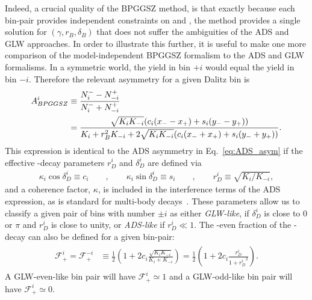 Indeed, a crucial quality of the BPGGSZ method, is that exactly because each bin-pair provides independent constraints on \xpm and \ypm, the method provides a single solution for $(\gamma, r_B, \delta_B)$ that does not suffer the ambiguities of the ADS and GLW approaches. In order to illustrate this further, it is useful to make one more comparison of the model-independent BPGGSZ formalism to the ADS and GLW formalisms. In a \CP symmetric world, the \Bp yield in bin $+i$ would equal the \Bm yield in bin $-i$. Therefore the relevant \CP asymmetry for a given Dalitz bin is
\begin{align}
\begin{split}\label{eq:Ai_definition}
        A_{BPGGSZ}^i &\equiv \frac{N^-_i - N^+_{-i}}{N^-_i + N^+_{-i}} \\
    &= \frac{\sqrt{K_i K_{-i}}(c_i(x_--x_+)+s_i(y_--y_+))}{K_i+r_B^2K_{-i} + 2 \sqrt{K_i K_{-i}}(c_i(x_-+x_+)+s_i(y_-+y_+))}.
\end{split}
\end{align}
This expression is identical to the ADS asymmetry in Eq.~\eqref{eq:ADS_asym} if the effective \D-decay parameters $r_D^i$ and $\delta_D^i$ are defined via
\begin{align}
    \kappa_i\cos\delta_D^i \equiv c_i \qquad, \qquad \kappa_i\sin \delta_D^i \equiv s_i \qquad, \qquad r_D^i \equiv \sqrt{K_i/K_{-i}},
\end{align}
and a coherence factor, $\kappa$, is included in the interference terms of the ADS expression, as is standard for multi-body \D decays~\cite{gronauImprovingBoundsGamma2003}. These parameters allow us to classify a given pair of bins with number $\pm i$ as either \emph{GLW-like}, if $ \delta_D^i$ is close to $0$ or $\pi$ and $r_D^i$  is close to unity, or \emph{ADS-like} if $r_D^i \ll 1$. The \CP-even fraction of the \D-decay can also be defined for a given bin-pair:
\begin{align}
\begin{split}
    \mathcal F_{+}^i = \mathcal F_+^{-i} &\equiv \frac{1}{2}\left(1 + 2c_i \frac{\sqrt{K_i K_{-i}}}{K_i + K_{-i}}\right) = \frac{1}{2}\left(1 + 2c_i \frac{r_D^i}{1+{r_D^i}^2}\right).
\end{split}
\end{align}
A GLW-even-like bin pair will have $\mathcal F_{+}^i\simeq 1$ and a GLW-odd-like bin pair will have $\mathcal F_{+}^i\simeq 0$.

